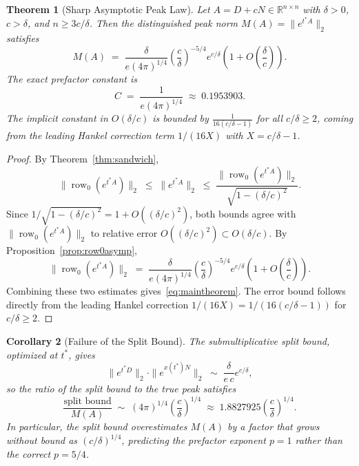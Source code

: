 \documentclass[11pt,reqno]{article}
\theoremstyle{plain}
\newtheorem{theorem}{Theorem}[section]
\newtheorem{corollary}[theorem]{Corollary}
\theoremstyle{definition}
\theoremstyle{remark}
\numberwithin{equation}{section}
\begin{document}
\begin{theorem}[Sharp Asymptotic Peak Law]\label{thm:main}
Let $A = D + cN \in \mathbb{R}^{n\times n}$ with $\delta > 0$, $c > \delta$, and $n \ge 3c/\delta$. Then the distinguished peak norm $M(A) = \|e^{t^*A}\|_2$ satisfies
\begin{equation}\label{eq:maintheorem}
  M(A) \;=\; \frac{\delta}{e(4\pi)^{1/4}} \left(\frac{c}{\delta}\right)^{-5/4} e^{c/\delta} \left(1 + O\left(\frac{\delta}{c}\right)\right).
\end{equation}
The exact prefactor constant is
\begin{equation}\label{eq:exact_constant}
  C \;=\; \frac{1}{e(4\pi)^{1/4}} \;\approx\; 0.1953903.
\end{equation}
The implicit constant in $O(\delta/c)$ is bounded by $\frac{1}{16(c/\delta - 1)}$ for all $c/\delta \ge 2$, coming from the leading Hankel correction term $1/(16X)$ with $X = c/\delta - 1$.
\end{theorem}

\begin{proof}
By Theorem~\ref{thm:sandwich},
\[
  \|\operatorname{row}_0(e^{t^*A})\|_2 \;\le\; \|e^{t^*A}\|_2 \;\le\; \frac{\|\operatorname{row}_0(e^{t^*A})\|_2}{\sqrt{1 - (\delta/c)^2}}.
\]
Since $1/\sqrt{1 - (\delta/c)^2} = 1 + O((\delta/c)^2)$, both bounds agree with $\|\operatorname{row}_0(e^{t^*A})\|_2$ to relative error $O((\delta/c)^2) \subset O(\delta/c)$. By Proposition~\ref{prop:row0asymp},
\[
  \|\operatorname{row}_0(e^{t^*A})\|_2 \;=\; \frac{\delta}{e(4\pi)^{1/4}} \left(\frac{c}{\delta}\right)^{-5/4} e^{c/\delta} \left(1 + O\left(\frac{\delta}{c}\right)\right).
\]
Combining these two estimates gives~\eqref{eq:maintheorem}. The error bound follows directly from the leading Hankel correction $1/(16X) = 1/(16(c/\delta - 1))$ for $c/\delta \ge 2$.
\end{proof}

\begin{corollary}[Failure of the Split Bound]\label{cor:splitbound}
The submultiplicative split bound, optimized at $t^*$, gives
\begin{equation}\label{eq:splitbound}
  \|e^{t^*D}\|_2 \cdot \|e^{x(t^*)N}\|_2 \;\sim\; \frac{\delta}{e\,c} e^{c/\delta},
\end{equation}
so the ratio of the split bound to the true peak satisfies
\begin{equation}\label{eq:splitratio}
  \frac{\text{split bound}}{M(A)} \;\sim\; (4\pi)^{1/4} \left(\frac{c}{\delta}\right)^{1/4} \;\approx\; 1.8827925 \left(\frac{c}{\delta}\right)^{1/4}.
\end{equation}
In particular, the split bound overestimates $M(A)$ by a factor that grows without bound as $(c/\delta)^{1/4}$, predicting the prefactor exponent $p = 1$ rather than the correct $p = 5/4$.
\end{corollary}
\end{document}

